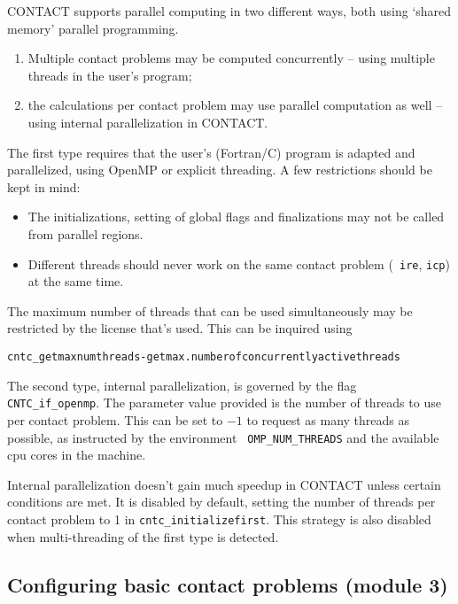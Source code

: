 \documentclass[12pt]{report}
\begin{document}
CONTACT supports parallel computing in two different ways, both using
`shared memory' parallel programming.
\begin{enumerate}
\item Multiple contact problems may be computed concurrently -- using
        multiple threads in the user's program;
\item the calculations per contact problem may use parallel computation
        as well -- using internal parallelization in CONTACT.
\end{enumerate}
The first type requires that the user's (Fortran/C) program is adapted and
parallelized, using OpenMP or explicit threading. A few restrictions should
be kept in mind:
\begin{itemize}
\item The initializations, setting of global flags and finalizations may
        not be called from parallel regions.
\item Different threads should never work on the same contact problem ({\tt
        ire}, {\tt icp}) at the same time.
\end{itemize}
The maximum number of threads that can be used simultaneously may be
restricted by the license that's used. This can be inquired using
\begin{alltt}\small
cntc_getmaxnumthreads       - get max.number of concurrently active threads
\end{alltt}
The second type, internal parallelization, is governed by the flag {\tt
CNTC\_if\_openmp}. The parameter value provided is the number of threads
to use per contact problem. This can be set to $-1$ to request as many
threads as possible, as instructed by the environment {\tt
OMP\_NUM\_THREADS} and the available cpu cores in the machine.

Internal parallelization doesn't gain much speedup in CONTACT unless
certain conditions are met. It is disabled by default, setting the number
of threads per contact problem to 1 in {\tt cntc\_initia\-li\-ze\-first}. This
strategy is also disabled when multi-threading of the first type is detected.

\subsection{Configuring basic contact problems (module 3)}
\end{document}
